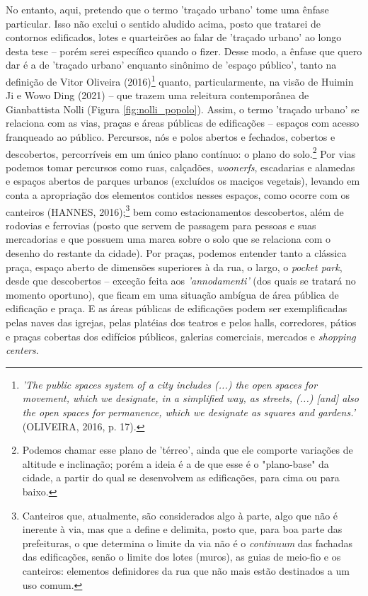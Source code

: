 \documentclass[]{report}
\begin{document}
No entanto, aqui, pretendo que o termo 'traçado urbano' tome uma ênfase particular. Isso não exclui o sentido aludido acima, posto que tratarei de contornos edificados, lotes e quarteirões ao falar de 'traçado urbano' ao longo desta tese – porém serei específico quando o fizer. Desse modo, a ênfase que quero dar é a de 'traçado urbano' enquanto sinônimo de 'espaço público', tanto na definição de Vitor Oliveira (2016)\footnote[8]{\textit{'The public spaces system of a city includes (...) the open spaces for movement, which we designate, in a simplified way, as streets, (...) [and] also the open spaces for permanence, which we designate as squares and gardens.'} (OLIVEIRA, 2016, p. 17).} quanto, particularmente, na visão de Huimin Ji e Wowo Ding (2021) – que trazem uma releitura contemporânea de Gianbattista Nolli (Figura \ref{fig:nolli_popolo}). Assim, o termo 'traçado urbano' se relaciona com as vias, praças e áreas públicas de edificações – espaços com acesso franqueado ao público. Percursos, nós e polos abertos e fechados, cobertos e descobertos, percorríveis em um único plano contínuo: o plano do solo.\footnote[9]{Podemos chamar esse plano de 'térreo', ainda que ele comporte variações de altitude e inclinação; porém a ideia é a de que esse é o "plano-base" da cidade, a partir do qual se desenvolvem as edificações, para cima ou para baixo.} Por vias podemos tomar percursos como ruas, calçadões, \textit{woonerfs}, escadarias e alamedas e espaços abertos de parques urbanos (excluídos os maciços vegetais), levando em conta a apropriação dos elementos contidos nesses espaços, como ocorre com os canteiros (HANNES, 2016);\footnote[10]{Canteiros que, atualmente, são considerados algo à parte, algo que não é inerente à via, mas que a define e delimita, posto que, para boa parte das prefeituras, o que determina o limite da via não é o \textit{continuum} das fachadas das edificações, senão o limite dos lotes (muros), as guias de meio-fio e os canteiros: elementos definidores da rua que não mais estão destinados a um uso comum.} bem como estacionamentos descobertos, além de rodovias e ferrovias (posto que servem de passagem para pessoas e suas mercadorias e que possuem uma marca sobre o solo que se relaciona com o desenho do restante da cidade). Por praças, podemos entender tanto a clássica praça, espaço aberto de dimensões superiores à da rua, o largo, o \textit{pocket park}, desde que descobertos – exceção feita aos \textit{'annodamenti'} (dos quais se tratará no momento oportuno), que ficam em uma situação ambígua de área pública de edificação e praça. E as áreas públicas de edificações podem ser exemplificadas pelas naves das igrejas, pelas platéias dos teatros e pelos halls, corredores, pátios e praças cobertas dos  edifícios públicos, galerias comerciais, mercados e \textit{shopping centers}.
\end{document}
